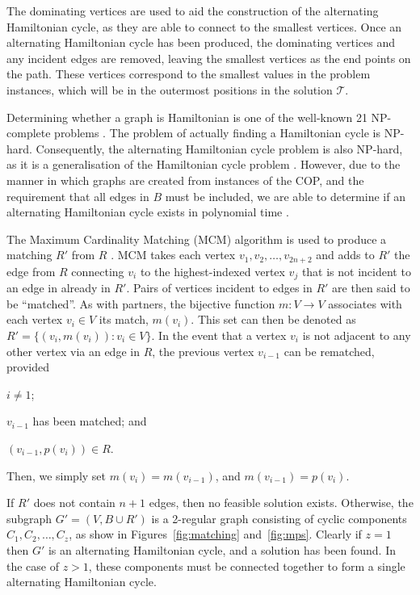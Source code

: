 \documentclass{elsarticle}
\begin{document}
The dominating vertices are used to aid the construction of the alternating Hamiltonian cycle, as they are able to connect to the smallest vertices. Once an alternating Hamiltonian cycle has been produced, the dominating vertices and any incident edges are removed, leaving the smallest vertices as the end points on the path. These vertices correspond to the smallest values in the problem instances, which will be in the outermost positions in the solution $\mathcal{T}$.

Determining whether a graph is Hamiltonian is one of the well-known 21 NP-complete problems \cite{karp1972}. The problem of actually finding a Hamiltonian cycle is NP-hard. Consequently, the alternating Hamiltonian cycle problem is also NP-hard, as it is a generalisation of the Hamiltonian cycle problem \cite{haggkvist1977}. However, due to the manner in which graphs are created from instances of the COP, and the requirement that all edges in $B$ must be included, we are able to determine if an alternating Hamiltonian cycle exists in polynomial time \cite{hawa2018}.

The Maximum Cardinality Matching (MCM) algorithm is used to produce a matching $R'$ from $R$ \cite{mahadev1994}. MCM takes each vertex $v_1, v_2,\dotsc,v_{2n+2}$ and adds to $R'$ the edge from $R$ connecting $v_i$ to the highest-indexed vertex $v_j$ that is not incident to an edge in already in $R'$. Pairs of vertices incident to edges in $R'$ are then said to be ``matched''. As with partners, the bijective function $m : V \to V$ associates with each vertex $v_i \in V$ its match, $m(v_i)$. This set can then be denoted as $R' = \{(v_i, m(v_i)): v_i \in V\}$. In the event that a vertex $v_i$ is not adjacent to any other vertex via an edge in $R$, the previous vertex $v_{i-1}$ can be rematched, provided 
\begin{enumerate*}[label={(\alph*)}]
	\item $i \neq 1$;
	\item $v_{i-1}$ has been matched; and
	\item $(v_{i-1}, p(v_i)) \in R$.
\end{enumerate*} 
Then, we simply set $m(v_i) = m(v_{i-1})$, and $m(v_{i-1}) = p(v_i)$.

If $R'$ does not contain $n+1$ edges, then no feasible solution exists. Otherwise, the subgraph $G'=(V, B \cup R')$ is a 2-regular graph consisting of cyclic components $C_1,C_2,\dotsc,C_z$, as show in Figures~\ref{fig:matching} and~\ref{fig:mps}. Clearly if $z = 1$ then $G'$ is an alternating Hamiltonian cycle, and a solution has been found. In the case of $z > 1$, these components must be connected together to form a single alternating Hamiltonian cycle.
\end{document}
